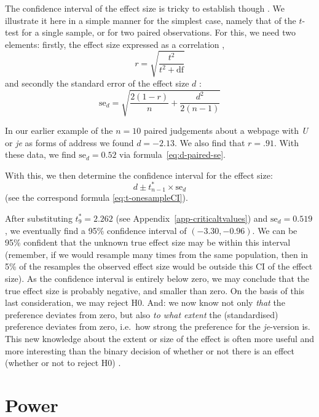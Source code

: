 \documentclass[
]{book}
\begin{document}
The confidence interval of the effect size is tricky to establish though
\citep{Naka07, Chen15}. We illustrate it here in a simple manner for
the simplest case, namely that of the \(t\)-test for a single sample,
or for two paired observations. For this, we need two elements:
firstly, the effect size expressed as a correlation \citep[ p.359, formula 12.1]{Rose08}, \[r = \sqrt{ \frac{t^2}{t^2+\textrm{df}} }\] and secondly
the standard error of the effect size \(d\) \citep[ p.600,
formula 18]{Naka07}:\\
\begin{equation}
  \label{eq:d-paired-se}
    \textrm{se}_d = \sqrt{ \frac{2(1-r)}{n} + \frac{d^2}{2(n-1)} }
\end{equation}

In
our earlier example of the \(n=10\) paired judgements about a webpage
with \emph{U} or \emph{je} as forms of address we found \(d=-2.13\). We also find
that \(r=.91\). With these data, we find \(\textrm{se}_d = 0.52\) via
formula~\eqref{eq:d-paired-se}.

With this, we then determine the confidence interval for the
effect size:
\begin{equation}
   \label{eq:d-paired-CI}
    d \pm t^*_{n-1} \times \textrm{se}_d 
\end{equation}
(see the correspond
formula \eqref{eq:t-onesampleCI}).

After substituting \(t^*_9=2.262\) (see Appendix~\ref{app-criticaltvalues}) and
\(\textrm{se}_d = 0.519\), we eventually find a 95\% confidence interval of \((-3.30,-0.96)\).
We can be 95\% confident that the unknown true effect size may be within this interval (remember, if we would resample many times from the same population, then in 5\% of the resamples the observed effect size would be outside this CI of the effect size). As the confidence interval is entirely below zero, we may conclude that the true effect size is probably negative, and smaller than zero. On the basis of this last consideration, we may reject H0.
And: we now know not only \emph{that} the preference deviates from zero, but
also \emph{to what extent} the (standardised) preference deviates from zero,
i.e.~how strong the preference for the \emph{je}-version is. This new knowledge
about the extent or size of the effect is often more useful and more interesting
than the binary decision of whether or not there is an effect (whether or not
to reject H0) \citep{Cumm12}.

\hypertarget{ch-power}{%
\chapter{Power}\label{ch-power}}
\end{document}
